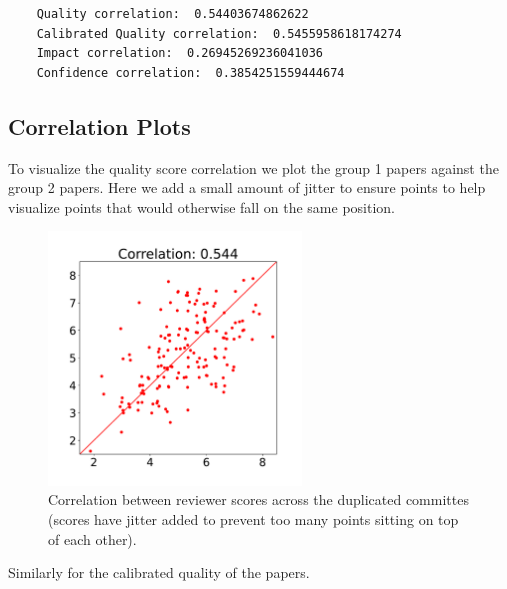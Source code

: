 \begin{verbatim}
    Quality correlation:  0.54403674862622
    Calibrated Quality correlation:  0.5455958618174274
    Impact correlation:  0.26945269236041036
    Confidence correlation:  0.3854251559444674
\end{verbatim}

\hypertarget{correlation-plots}{%
\subsection{Correlation Plots}\label{correlation-plots}}

To visualize the quality score correlation we plot the group 1 papers
against the group 2 papers. Here we add a small amount of jitter to
ensure points to help visualize points that would otherwise fall on the
same position.

\begin{figure}[htb]
\includegraphics[width=0.60\textwidth]{diagrams/neurips/quality-correlation.pdf}


\caption{Correlation between reviewer scores across the duplicated committes (scores have jitter added to prevent too many points sitting on top of each other).}
\label{quality-correlation}
\end{figure}

Similarly for the calibrated quality of the papers.

